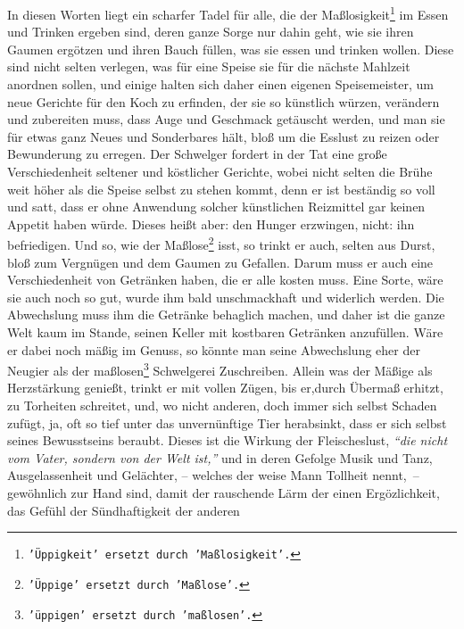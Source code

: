 \medskip

In diesen Worten liegt ein scharfer Tadel für alle, die der
Maßlosigkeit\footnote{\texttt{'Üppigkeit' ersetzt durch 'Maßlosigkeit'.}} im Essen
und Trinken ergeben sind, deren ganze Sorge nur dahin geht, wie sie ihren
Gaumen ergötzen und ihren Bauch füllen, was sie essen und trinken wollen. Diese
sind nicht selten verlegen, was für eine Speise sie für die nächste Mahlzeit
anordnen sollen, und einige halten sich daher einen eigenen
Speisemeister, um
neue Gerichte für den Koch zu erfinden,
der sie so künstlich würzen, verändern
und zubereiten muss, dass Auge und Geschmack getäuscht werden, und man sie für
etwas ganz Neues und Sonderbares hält, bloß um die Esslust zu reizen oder
Bewunderung zu erregen. Der Schwelger fordert in der
Tat eine große
Verschiedenheit seltener und köstlicher Gerichte, wobei nicht selten die Brühe
weit höher als die Speise selbst zu stehen kommt, denn er ist beständig so voll
und satt, dass er ohne Anwendung solcher künstlichen
Reizmittel gar keinen
Appetit haben würde. Dieses heißt aber: den Hunger erzwingen, nicht: ihn
befriedigen. Und so, wie der Maßlose\footnote{\texttt{'Üppige' ersetzt durch
'Maßlose'.}} isst,
so trinkt er auch, selten aus Durst,
bloß zum Vergnügen und dem Gaumen zu Gefallen. Darum muss er
auch eine
Verschiedenheit von Getränken haben, die er alle kosten
muss. Eine Sorte, wäre
sie auch noch so gut, wurde ihm bald unschmackhaft und widerlich werden. Die
Abwechslung muss ihm die Getränke behaglich machen, und daher ist die ganze Welt
kaum im Stande, seinen Keller mit kostbaren Getränken anzufüllen. Wäre er dabei
noch mäßig im Genuss, so könnte man seine Abwechslung eher der Neugier als der
maßlosen\footnote{\texttt{'üppigen' ersetzt durch 'maßlosen'.}} Schwelgerei
Zuschreiben. Allein was
der Mäßige als Herzstärkung
genießt, trinkt er mit vollen Zügen, bis er,durch
Übermaß erhitzt, zu
Torheiten schreitet, und, wo nicht anderen, doch immer sich selbst Schaden
zufügt, ja, oft so tief unter das unvernünftige Tier herabsinkt, dass er sich
selbst seines Bewusstseins beraubt. Dieses ist die Wirkung der Fleischeslust,
\textit{"`die nicht vom Vater, sondern von der Welt ist,"'} und in deren Gefolge
Musik
und Tanz, Ausgelassenheit und Gelächter, -- welches der weise Mann
Tollheit
nennt,~-- gewöhnlich zur Hand sind, damit der rauschende Lärm der einen
Ergözlichkeit, das Gefühl der Sündhaftigkeit der anderen
